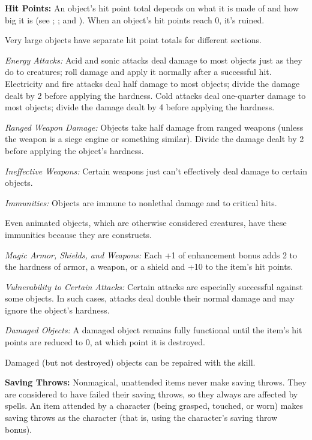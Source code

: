 \textbf{Hit Points:} An object's hit point total depends on what it is made of and how big it is (see ; ; and ). When an object's hit points reach 0, it's ruined.

Very large objects have separate hit point totals for different sections.

\textit{Energy Attacks:} Acid and sonic attacks deal damage to most objects just as they do to creatures; roll damage and apply it normally after a successful hit. Electricity and fire attacks deal half damage to most objects; divide the damage dealt by 2 before applying the hardness. Cold attacks deal one-quarter damage to most objects; divide the damage dealt by 4 before applying the hardness.

\textit{Ranged Weapon Damage:} Objects take half damage from ranged weapons (unless the weapon is a siege engine or something similar). Divide the damage dealt by 2 before applying the object's hardness.

\textit{Ineffective Weapons:} Certain weapons just can't effectively deal damage to certain objects.

\textit{Immunities:} Objects are immune to nonlethal damage and to critical hits.

Even animated objects, which are otherwise considered creatures, have these immunities because they are constructs.

\textit{Magic Armor, Shields, and Weapons:} Each +1 of enhancement bonus adds 2 to the hardness of armor, a weapon, or a shield and +10 to the item's hit points.

\textit{Vulnerability to Certain Attacks:} Certain attacks are especially successful against some objects. In such cases, attacks deal double their normal damage and may ignore the object's hardness.

\textit{Damaged Objects:} A damaged object remains fully functional until the item's hit points are reduced to 0, at which point it is destroyed.

Damaged (but not destroyed) objects can be repaired with the  skill.

\textbf{Saving Throws:} Nonmagical, unattended items never make saving throws. They are considered to have failed their saving throws, so they always are affected by spells. An item attended by a character (being grasped, touched, or worn) makes saving throws as the character (that is, using the character's saving throw bonus).

